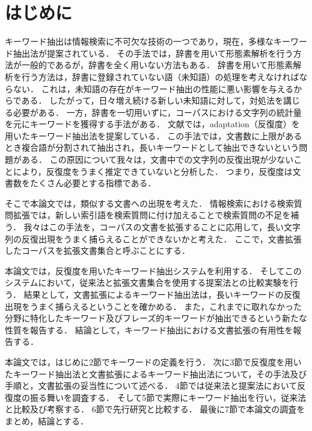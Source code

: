 \documentclass[japanese]{jnlp_1.2c}
\begin{document}
\maketitle
\vspace{-1\baselineskip}




\section{はじめに}
キーワード抽出は情報検索に不可欠な技術の一つであり，現在，多様なキーワード抽出法が提案されている．
その手法では，辞書を用いて形態素解析を行う方法\cite{Nakagawa1997}が一般的であるが，辞書を全く用いない方法\cite{TakedaAndUmemura2001}もある．
辞書を用いて形態素解析を行う方法は，辞書に登録されていない語（未知語）の処理を考えなければならない．
これは，未知語の存在がキーワード抽出の性能に悪い影響を与えるからである．
したがって，日々増え続ける新しい未知語に対して，対処法を講じる必要がある．
一方，辞書を一切用いずに，コーパスにおける文字列の統計量を元にキーワードを獲得する手法がある．
文献\cite{TakedaAndUmemura2001}では，adaptation（反復度）を用いたキーワード抽出法を提案している．
この手法では，文書数に上限があるとき複合語が分割されて抽出され，長いキーワードとして抽出できないという問題がある．
この原因について我々は，文書中での文字列の反復出現が少ないことにより，反復度をうまく推定できていないと分析した．
つまり，反復度は文書数をたくさん必要とする指標である．

そこで本論文では，類似する文書への出現を考えた．
情報検索における検索質問拡張では，新しい索引語を検索質問に付け加えることで検索質問の不足を補う．
我々はこの手法を，コーパスの文書を拡張することに応用して，長い文字列の反復出現をうまく捕らえることができないかと考えた．
ここで，文書拡張したコーパスを拡張文書集合と呼ぶことにする．

本論文では，反復度を用いたキーワード抽出システムを利用する．
そしてこのシステムにおいて，従来法と拡張文書集合を使用する提案法との比較実験を行う．
結果として，文書拡張によるキーワード抽出法は，長いキーワードの反復出現をうまく捕らえるということを確かめる．
また，これまでに取れなかった分野に特化したキーワード及びフレーズ的キーワードが抽出できるという新たな性質を報告する．
結論として，キーワード抽出における文書拡張の有用性を報告する．

本論文では，はじめに2節でキーワードの定義を行う．
次に3節で反復度を用いたキーワード抽出法と文書拡張によるキーワード抽出法について，その手法及び手順と，文書拡張の妥当性について述べる．
4節では従来法と提案法において反復度の振る舞いを調査する．
そして5節で実際にキーワード抽出を行い，従来法と比較及び考察する．
6節で先行研究と比較する．
最後に7節で本論文の調査をまとめ，結論とする．
\end{document}
